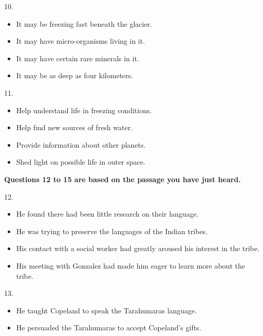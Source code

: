 \documentclass[UTF8,11pt]{ctexart}
\begin{document}
10.


\begin{itemize}[leftmargin=2em,itemsep=.2em,topsep=.4em]\item[A.] It may be freezing fast beneath the glacier.
\item[B.] It may have micro-organisms living in it.
\item[C.] It may have certain rare minerals in it.
\item[D.] It may be as deep as four kilometers.
\end{itemize}

11.


\begin{itemize}[leftmargin=2em,itemsep=.2em,topsep=.4em]\item[A.] Help understand life in freezing conditions.
\end{itemize}

\begin{itemize}[leftmargin=2em,itemsep=.2em,topsep=.4em]\item[B.] Help fmd new sources of fresh water.
\item[C.] Provide information about other planets.
\item[D.] Shed light on possible life in outer space.
\end{itemize}

\textbf{Questions 12 to 15 are based on the passage you have just heard.}


12.


\begin{itemize}[leftmargin=2em,itemsep=.2em,topsep=.4em]\item[A.] He found there had been little research on their language.
\item[B.] He was trying to preserve the languages of the Indian tribes.
\item[C.] His contact with a social worker had greatly aroused his interest in the tribe.
\item[D.] His meeting with Gonzalez had made him eager to learn more about the tribe.
\end{itemize}

13.


\begin{itemize}[leftmargin=2em,itemsep=.2em,topsep=.4em]\item[A.] He taught Copeland to speak the Tarahumaras language.
\end{itemize}

\begin{itemize}[leftmargin=2em,itemsep=.2em,topsep=.4em]\item[B.] He persuaded the Tarahumaras to accept Copeland's gifts.
\end{itemize}
\end{document}
